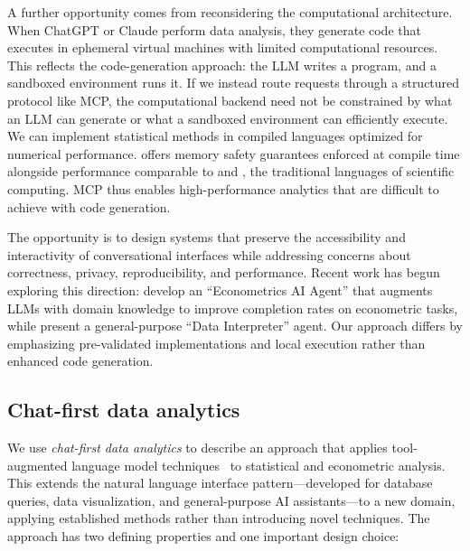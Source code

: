 A further opportunity comes from reconsidering the computational architecture.
When ChatGPT or Claude perform data analysis, they generate 
code that executes in ephemeral virtual machines with limited computational
resources. This reflects the code-generation approach: the LLM writes a program,
and a sandboxed environment runs it. If we instead route requests through a
structured protocol like MCP, the computational backend need not be constrained
by what an LLM can generate or what a sandboxed  environment
can efficiently execute. We can implement statistical methods in compiled
languages optimized for numerical performance.  offers memory
safety guarantees enforced at compile time alongside performance comparable to
 and , the traditional languages of scientific
computing. MCP thus enables high-performance analytics that are difficult to
achieve with code generation.

The opportunity is to design systems that preserve the accessibility and
interactivity of conversational interfaces while addressing concerns about
correctness, privacy, reproducibility, and performance. Recent work has begun
exploring this direction: \cite{Chen+Shen+Ma:2025} develop an ``Econometrics AI
Agent'' that augments LLMs with domain knowledge to improve completion rates on
econometric tasks, while \cite{Hong+etal:2024} present a general-purpose ``Data
Interpreter'' agent. Our approach differs by emphasizing pre-validated
implementations and local execution rather than enhanced code generation.

\subsection{Chat-first data analytics}

We use \emph{chat-first data analytics} to describe an approach that applies
tool-augmented language model techniques~\citep{Schick+etal:2023, Yao+etal:2023}
to statistical and econometric analysis. This extends the natural language
interface pattern---developed for database queries, data visualization, and
general-purpose AI assistants---to a new domain, applying established methods
rather than introducing novel techniques. The approach has two defining
properties and one important design choice:

